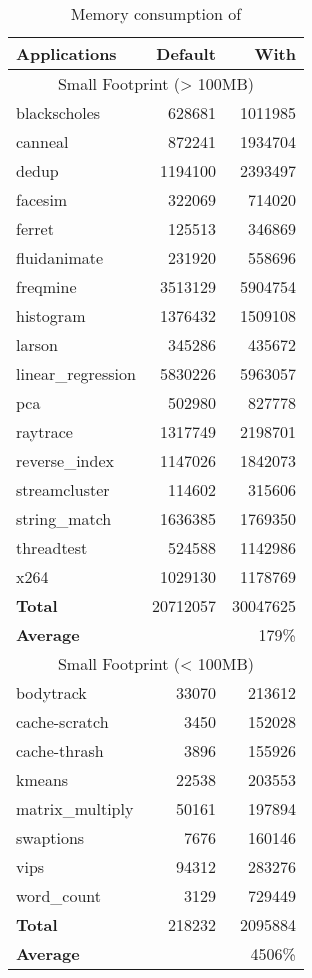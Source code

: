 \begin{table}[!tp]  
\centering
    \caption{Memory consumption of \MP{}\label{tab:memory_consumption}}
\begin{tabular}{l r r }    
\hline    
Applications &  Default  & With \MP{}\\  \hline  
 \multicolumn{3}{c}{Small Footprint (> 100MB)}		\\
blackscholes & 628681 & 1011985 \\ 
canneal & 872241 & 1934704 \\ 
dedup & 1194100 & 2393497 \\ 
facesim & 322069 & 714020 \\ 
ferret & 125513 & 346869 \\ 
fluidanimate & 231920 & 558696 \\ 
freqmine & 3513129 & 5904754 \\ 
histogram & 1376432 & 1509108 \\ 
larson & 345286 & 435672 \\ 
linear\_regression & 5830226 & 5963057 \\ 
pca & 502980 & 827778 \\ 
raytrace & 1317749 & 2198701 \\ 
reverse\_index & 1147026 & 1842073 \\ 
streamcluster & 114602 & 315606 \\ 
string\_match & 1636385 & 1769350 \\ 
threadtest & 524588 & 1142986 \\ 
x264 & 1029130 & 1178769 \\  \hline
\textbf{Total} &  20712057 & 30047625 \\ 
\textbf{Average} &  & 179\% \\  \hline
 \multicolumn{3}{c}{Small Footprint (< 100MB)}		\\
bodytrack & 33070 & 213612 \\ 
cache-scratch & 3450 & 152028 \\ 
cache-thrash & 3896 & 155926 \\ 
kmeans & 22538 & 203553 \\ 
matrix\_multiply & 50161 & 197894 \\ 
swaptions & 7676 & 160146 \\ 
vips & 94312 & 283276 \\ 
word\_count & 3129 & 729449 \\ \hline 
\textbf{Total} & 218232&  2095884 \\   
\textbf{Average} & & 4506\%  \\ \hline
   \end{tabular}
   \end{table}
